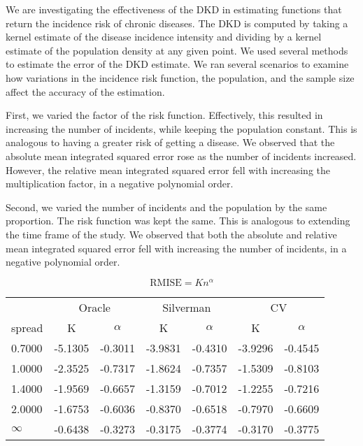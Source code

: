 

We are investigating the effectiveness of the DKD in estimating functions that return the incidence risk of chronic diseases. 
The DKD is computed by taking a kernel estimate of the disease incidence intensity and dividing by a kernel estimate of the population density at any given point.
We used several methods to estimate the error of the DKD estimate.
We ran several scenarios to examine how variations in the incidence risk function, the population, and the sample size affect the accuracy of the estimation. 

First, we varied the \gls{factor} of the risk function.
Effectively, this resulted in increasing the number of incidents, while keeping the population constant.
This is analogous to having a greater risk of getting a disease.
We observed that the absolute mean integrated squared error rose as the number of incidents increased.
However, the relative mean integrated squared error fell with increasing the multiplication \gls{factor}, in a negative polynomial order.

Second, we varied the number of incidents and the population by the same proportion.
The risk function was kept the same.
This is analogous to extending the time frame of the study.
We observed that both the absolute and relative mean integrated squared error fell with increasing the number of incidents, in a negative polynomial order.

\[
    \mbox{RMISE} = K n^{\alpha}
\]


\begin{table}[htbp]
\begin{tabular}{l*6c}
  \hline
  & \multicolumn{2}{c}{Oracle} & \multicolumn{2}{c}{Silverman} & \multicolumn{2}{c}{CV} \\ 
  \gls{spread} & K & \( \alpha \) & K & \( \alpha \) & K & \( \alpha \) \\ 
  \hline
  0.7000 & -5.1305 & -0.3011 & -3.9831 & -0.4310 & -3.9296 & -0.4545 \\ 
  1.0000 & -2.3525 & -0.7317 & -1.8624 & -0.7357 & -1.5309 & -0.8103 \\ 
  1.4000 & -1.9569 & -0.6657 & -1.3159 & -0.7012 & -1.2255 & -0.7216 \\ 
  2.0000 & -1.6753 & -0.6036 & -0.8370 & -0.6518 & -0.7970 & -0.6609 \\ 
  \( \infty \) & -0.6438 & -0.3273 & -0.3175 & -0.3774 & -0.3170 & -0.3775 \\ 
  \hline
\end{tabular}
\end{table}

